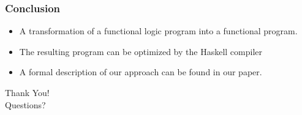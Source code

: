 \documentclass[utf8,handout]{beamer}
\begin{document}
\begin{frame}
\frametitle{Conclusion}
\begin{itemize}
\item A transformation of a functional logic program into a functional program.
\item The resulting program can be optimized by the Haskell compiler
\item A formal description of our approach can be found in our paper.
\end{itemize}
\end{frame}

\begin{frame}
\begin{center}

 {\huge Thank You!}\\[3ex]
 \pause
 {\huge Questions?}
 
\end{center}
\end{frame}
\end{document}
